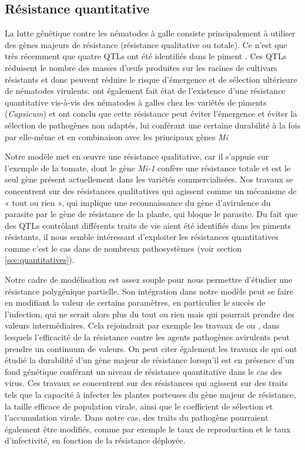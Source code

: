 	
	 
\subsection{Résistance quantitative}
	
	La lutte génétique contre les nématodes à galle consiste principalement à utiliser des gènes majeurs de résistance (résistance qualitative ou totale). Ce n'est que  très récemment que quatre \glspl{QTL} ont été identifiés dans le piment \citep{Barbary2016}. Ces \glspl{QTL} réduisent le nombre 
des masses d'œufs produites sur les racines de cultivars résistants \citep{Barbary2014} et donc
peuvent réduire le risque d'émergence et de sélection ultérieure de nématodes virulents. \citet{Sanchez-Solana2017} ont également fait état de l'existence d'une résistance quantitative vis-à-vis des nématodes à galles chez les variétés de piments (\textit{Capsicum}) et ont conclu que cette résistance peut éviter l'émergence et éviter la sélection de pathogènes non adaptés, lui conférant une certaine durabilité à la fois par elle-même et en combinaison avec les principaux gènes \textit{Mi}
	
	Notre modèle met en œuvre une résistance qualitative, car il s'appuie sur l'exemple de la tomate, dont le gène \textit{Mi-1} confère une résistance totale \citep{Milligan1998} et est le seul gène présent actuellement dans les variétés commercialisées.
Nos travaux se concentrent sur des résistances qualitatives qui agissent comme un
mécanisme de « tout ou rien », qui implique une reconnaissance du gène d’avirulence du parasite par le
gène de résistance de la plante, qui bloque le parasite. Du fait que des \glspl{QTL} contrôlant différents traits de vie aient été identifiés dans les piments résistants, il nous semble intéressant d’exploiter  les résistances quantitatives comme c'est le cas dans de nombreux pathosystèmes (voir section \ref{sec:quantitatives}).
	
	
	Notre cadre de modélisation est assez souple pour  nous permettre d'étudier une résistance  polygénique partielle.
	Son intégration dans notre modèle peut se faire en modifiant la valeur de certains paramètres, en particulier le succès de l'infection, qui ne serait alors plus du tout ou rien mais qui pourrait prendre des valeurs intermédiaires. Cela rejoindrait par exemple les travaux de  \citet{Leonard1977} ou  \citet{Tellier2007, Tellier2011}, dans lesquels
l'efficacité de la résistance contre les agents pathogènes avirulents  peut prendre un continuum  de valeurs.
On peut citer également les travaux de \citep{Rousseau2019} qui ont étudié la durabilité d'un gène majeur de résistance lorsqu’il est en présence d’un fond génétique conférant un niveau de résistance quantitative dans le cas des virus. Ces travaux se concentrent sur des résistances qui agissent sur des traits tels que la capacité à infecter les plantes porteuses du gène majeur de résistance,
la taille efficace de population virale, ainsi que le coefficient de sélection et l’accumulation virale.
Dans notre cas, des traits du pathogène pourraient également être modifiés, comme par exemple le taux de reproduction et le taux d'infectivité, en fonction de la résistance déployée.
	
